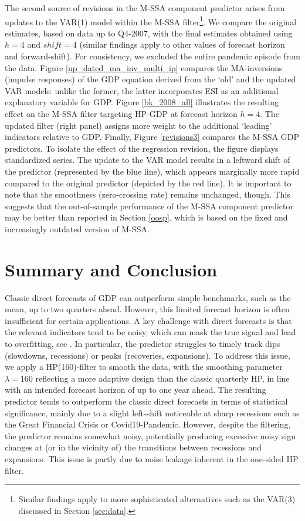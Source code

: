 \documentclass[11pt,a4paper]{article}
\begin{document}
The second source of revisions in the M-SSA component predictor arises from updates to the VAR(1) model within the M-SSA filter\footnote{Similar findings apply to more sophisticated alternatives such as the VAR(3) discussed in Section \eqref{sec:data}.}. We compare the original estimates, based on data up to Q4-2007, with the final estimates obtained using $h=4$ and $shift=4$ (similar findings apply to other values of forecast horizon and forward-shift).  For consistency, we excluded the entire pandemic episode from the data. Figure \eqref{up_dated_ma_inv_multi_ip} compares the MA-inversions (impulse responses) of the GDP equation derived from the `old' and the updated VAR models: unlike the former, the latter incorporates ESI as an additional explanatory variable for GDP. Figure \eqref{bk_2008_all} illustrates the resulting effect on the M-SSA filter targeting HP-GDP at forecast horizon $h=4$. The updated filter (right panel) assigns more weight to the additional `leading' indicators relative to GDP. Finally, Figure \eqref{revisions3} compares the M-SSA GDP predictors. To isolate the effect of the regression revision, the figure displays standardized series. The update to the VAR model results in a leftward shift of the predictor (represented by the blue line), which appears marginally more rapid compared to the original predictor (depicted by the red line). It is important to note that the smoothness (zero-crossing rate) remains unchanged, though. 
This suggests that the out-of-sample performance of the M-SSA component predictor may be better than reported in Section \eqref{oosp}, which is based on the fixed and increasingly outdated version of M-SSA.


\section{Summary and Conclusion}\label{sec:conclusions}


Classic direct forecasts of GDP can outperform simple benchmarks, such as the mean, up to two quarters ahead. However, this limited forecast horizon is often insufficient for certain applications. A key challenge with direct forecasts is that the relevant indicators tend to be noisy, which can mask the true signal and lead to overfitting, see \cite{Hastie2009}. In particular, the predictor struggles to timely track dips (slowdowns, recessions) or peaks (recoveries, expansions). To address this issue, we apply a HP(160)-filter to smooth the data, with the smoothing parameter $\lambda=160$ reflecting a more adaptive design than the classic quarterly HP, in line with an intended forecast horizon of up to one year ahead. The resulting predictor tends to outperform the classic direct forecasts in terms of statistical significance, mainly due to a slight left-shift noticeable at sharp recessions such as the Great Financial Crisis or Covid19-Pandemic. However, despite the filtering, the predictor remains somewhat noisy, potentially producing excessive noisy sign changes at (or in the vicinity of) the transitions between recessions and expansions. This issue is partly due to noise leakage inherent in the one-sided HP filter. \\
\end{document}
